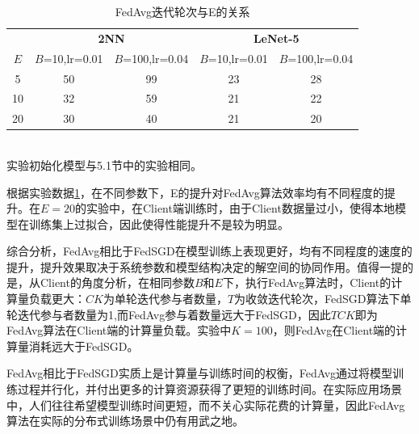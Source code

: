 \documentclass[zihao = -4,cn]{oucart}
\begin{document}
\begin{table}[!htbp]
\caption{\label{tab:expFedAvg2}FedAvg迭代轮次与E的关系}
\begin{center}
\begin{tabular}{ccccc}
\toprule
& \multicolumn{2}{c}{\textbf{2NN}} & \multicolumn{2}{c}{\textbf{LeNet-5}} \\
$E$ & $B$=10,lr=0.01 & $B$=100,lr=0.04 & $B$=10,lr=0.01 & $B$=100,lr=0.04 \\
\midrule
5 & 50  & 99  & 23  & 28  \\
10 & 32  & 59  & 21  & 22  \\
20 & 30  & 40 & 21  & 20 \\
\bottomrule
\end{tabular}
\footnotesize\\
实验初始化模型与5.1节中的实验相同。
\end{center}
\end{table}
根据实验数据\ref{tab:expFedAvg2}，在不同参数下，E的提升对FedAvg算法效率均有不同程度的提升。在$E=20$的实验中，在Client端训练时，由于Client数据量过小，使得本地模型在训练集上过拟合，因此使得性能提升不是较为明显。\par
综合分析，FedAvg相比于FedSGD在模型训练上表现更好，均有不同程度的速度的提升，提升效果取决于系统参数和模型结构决定的解空间的协同作用。值得一提的是，从Client的角度分析，在相同参数$B$和$E$下，执行FedAvg算法时，Client的计算量负载更大：$CK$为单轮迭代参与者数量，$T$为收敛迭代轮次，FedSGD算法下单轮迭代参与者数量为1,而FedAvg参与着数量远大于FedSGD，因此$TCK$即为FedAvg算法在Client端的计算量负载。实验中$K=100$，则FedAvg在Client端的计算量消耗远大于FedSGD。\par
FedAvg相比于FedSGD实质上是计算量与训练时间的权衡，FedAvg通过将模型训练过程并行化，并付出更多的计算资源获得了更短的训练时间。在实际应用场景中，人们往往希望模型训练时间更短，而不关心实际花费的计算量，因此FedAvg算法在实际的分布式训练场景中仍有用武之地。
\end{document}
